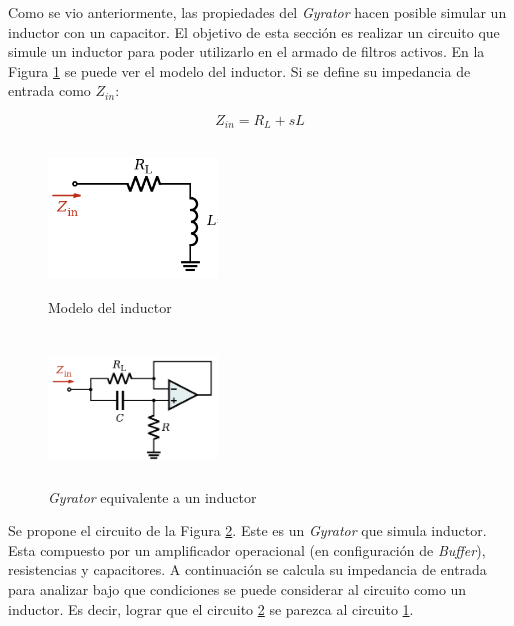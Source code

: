 Como se vio anteriormente, las propiedades del \textit{Gyrator} hacen posible simular un inductor con un capacitor. El objetivo de esta sección es realizar un circuito que simule un inductor para poder utilizarlo en el armado de filtros activos. 
En la Figura \ref{ej2_inductor_model} se puede ver el modelo del inductor. Si se define su impedancia de entrada como $Z_{in}$:

\begin{equation} Z_{in} = R_L + sL \label{ej2_ecua_inductor}\end{equation}

\begin{figure}[h!]                                                       
    \centering\includegraphics[width=0.4\textwidth, height=4cm]{../Ex2/Resources/ej2_inductor_model.png}
    \caption{Modelo del inductor}
    \label{ej2_inductor_model}
    \end{figure}


\begin{figure}[h!]                                                       
    \centering\includegraphics[width=0.4\textwidth, height=4cm]{../Ex2/Resources/ej2_gyrator_inductor.png}
    \caption{\textit{Gyrator} equivalente a un inductor}
    \label{ej2_gyrator_inductor}
    \end{figure}



Se propone el circuito de la Figura \ref{ej2_gyrator_inductor}. Este es un \textit{Gyrator} que simula inductor. Esta compuesto por un amplificador operacional (en configuración de \textit{Buffer}), resistencias y capacitores. A continuación se calcula su impedancia de entrada para analizar 
bajo que condiciones se puede considerar al circuito como un inductor. Es decir, lograr que el circuito \ref{ej2_gyrator_inductor} se parezca al circuito \ref{ej2_inductor_model}.

